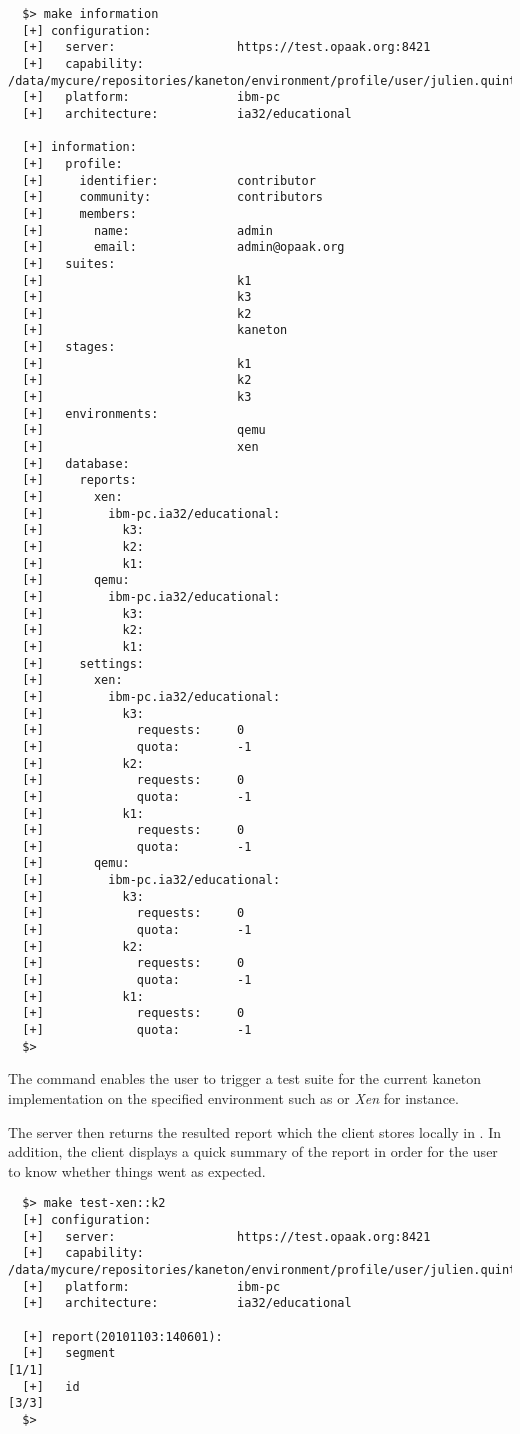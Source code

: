 \begin{verbatim}
  $> make information
  [+] configuration:
  [+]   server:                 https://test.opaak.org:8421
  [+]   capability:             /data/mycure/repositories/kaneton/environment/profile/user/julien.quintard/julien.quintard.cap
  [+]   platform:               ibm-pc
  [+]   architecture:           ia32/educational

  [+] information:
  [+]   profile:
  [+]     identifier:           contributor
  [+]     community:            contributors
  [+]     members:
  [+]       name:               admin
  [+]       email:              admin@opaak.org
  [+]   suites:
  [+]                           k1
  [+]                           k3
  [+]                           k2
  [+]                           kaneton
  [+]   stages:
  [+]                           k1
  [+]                           k2
  [+]                           k3
  [+]   environments:
  [+]                           qemu
  [+]                           xen
  [+]   database:
  [+]     reports:
  [+]       xen:
  [+]         ibm-pc.ia32/educational:
  [+]           k3:
  [+]           k2:
  [+]           k1:
  [+]       qemu:
  [+]         ibm-pc.ia32/educational:
  [+]           k3:
  [+]           k2:
  [+]           k1:
  [+]     settings:
  [+]       xen:
  [+]         ibm-pc.ia32/educational:
  [+]           k3:
  [+]             requests:     0
  [+]             quota:        -1
  [+]           k2:
  [+]             requests:     0
  [+]             quota:        -1
  [+]           k1:
  [+]             requests:     0
  [+]             quota:        -1
  [+]       qemu:
  [+]         ibm-pc.ia32/educational:
  [+]           k3:
  [+]             requests:     0
  [+]             quota:        -1
  [+]           k2:
  [+]             requests:     0
  [+]             quota:        -1
  [+]           k1:
  [+]             requests:     0
  [+]             quota:        -1
  $> 
\end{verbatim}

The  command enables the user to trigger a test suite for the
current kaneton implementation on the specified environment such as 
or \textit{Xen} for instance.

The server then returns the resulted report which the client stores locally
in . In addition, the client displays a quick
summary of the report in order for the user to know whether things went
as expected.

\begin{verbatim}
  $> make test-xen::k2
  [+] configuration:
  [+]   server:                 https://test.opaak.org:8421
  [+]   capability:             /data/mycure/repositories/kaneton/environment/profile/user/julien.quintard/julien.quintard.cap
  [+]   platform:               ibm-pc
  [+]   architecture:           ia32/educational

  [+] report(20101103:140601):
  [+]   segment                                                           [1/1]
  [+]   id                                                                [3/3]
  $> 
\end{verbatim}


